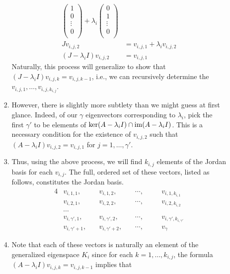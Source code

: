 \documentclass[../notes.tex]{subfiles}
\begin{document}
\begin{itemize}
\begin{enumerate}
\begin{enumerate}
\begin{align*}
\begin{pmatrix}
                    1\\
                    0\\
                    \vdots\\
                    0\\
                \end{pmatrix}
                +\lambda_i
                \begin{pmatrix}
                    0\\
                    1\\
                    \vdots\\
                    0\\
                \end{pmatrix}\\
                Jv_{i,j,2} &= v_{i,j,1}+\lambda_iv_{i,j,2}\\
                (J-\lambda_iI)v_{i,j,2} &= v_{i,j,1}
            \end{align*}
            Naturally, this process will generalize to show that $(J-\lambda_iI)v_{i,j,k}=v_{i,j,k-1}$, i.e., we can recursively determine the $v_{i,j,1},\dots,v_{i,j,k_{i,j}}$.
            \item However, there is slightly more subtlety than we might guess at first glance. Indeed, of our $\gamma$ eigenvectors corresponding to $\lambda_i$, pick the first $\gamma'$ to be elements of $\ker(A-\lambda_iI)\cap\operatorname{im}(A-\lambda_iI)$. This is a necessary condition for the existence of $v_{i,j,2}$ such that $(A-\lambda_iI)v_{i,j,2}=v_{i,j,1}$ for $j=1,\dots,\gamma'$.
            \item Thus, using the above process, we will find $k_{i,j}$ elements of the Jordan basis for each $v_{i,j}$. The full, ordered set of these vectors, listed as follows, constitutes the Jordan basis.
            \begin{alignat*}{4}
                &v_{i,1,1},\quad &&v_{i,1,2},\quad &&\cdots,\quad &&v_{i,1,k_{i,1}}\\
                &v_{i,2,1}, &&v_{i,2,2}, &&\cdots, &&v_{i,2,k_{i,2}}\\
                &\cdots\\
                &v_{i,\gamma',1}, &&v_{i,\gamma',2}, &&\cdots, &&v_{i,\gamma',k_{i,\gamma'}}\\
                &v_{i,\gamma'+1}, &&v_{i,\gamma'+2}, &&\cdots, &&v_\gamma
            \end{alignat*}
            \item Note that each of these vectors is naturally an element of the generalized eigenspace $K_i$ since for each $k=1,\dots,k_{i,j}$, the formula $(A-\lambda_iI)v_{i,j,k}=v_{i,j,k-1}$ implies that

\end{enumerate}
\end{enumerate}
\end{itemize}
\end{document}
